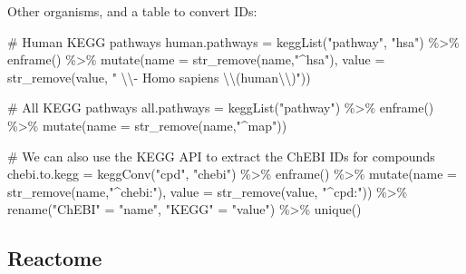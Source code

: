 \documentclass[
  24px,
  letterpaper,
  DIV=11,
  numbers=noendperiod]{scrartcl}
\newenvironment{Shaded}{\begin{snugshade}}{\end{snugshade}}
\newcommand{\AttributeTok}[1]{\textcolor[rgb]{0.40,0.45,0.13}{#1}}
\newcommand{\CommentTok}[1]{\textcolor[rgb]{0.37,0.37,0.37}{#1}}
\newcommand{\FunctionTok}[1]{\textcolor[rgb]{0.28,0.35,0.67}{#1}}
\newcommand{\NormalTok}[1]{\textcolor[rgb]{0.00,0.23,0.31}{#1}}
\newcommand{\OtherTok}[1]{\textcolor[rgb]{0.00,0.23,0.31}{#1}}
\newcommand{\SpecialCharTok}[1]{\textcolor[rgb]{0.37,0.37,0.37}{#1}}
\newcommand{\StringTok}[1]{\textcolor[rgb]{0.13,0.47,0.30}{#1}}
\begin{document}
Other organisms, and a table to convert IDs:

\begin{Shaded}
\begin{Highlighting}[]
\CommentTok{\# Human KEGG pathways}
\NormalTok{human.pathways }\OtherTok{=} \FunctionTok{keggList}\NormalTok{(}\StringTok{"pathway"}\NormalTok{, }\StringTok{"hsa"}\NormalTok{) }\SpecialCharTok{\%\textgreater{}\%} 
  \FunctionTok{enframe}\NormalTok{() }\SpecialCharTok{\%\textgreater{}\%} 
  \FunctionTok{mutate}\NormalTok{(}\AttributeTok{name =} \FunctionTok{str\_remove}\NormalTok{(name,}\StringTok{"\^{}hsa"}\NormalTok{), }
         \AttributeTok{value =} \FunctionTok{str\_remove}\NormalTok{(value, }\StringTok{" }\SpecialCharTok{\textbackslash{}\textbackslash{}}\StringTok{{-} Homo sapiens }\SpecialCharTok{\textbackslash{}\textbackslash{}}\StringTok{(human}\SpecialCharTok{\textbackslash{}\textbackslash{}}\StringTok{)"}\NormalTok{))}

\CommentTok{\# All KEGG pathways}
\NormalTok{all.pathways }\OtherTok{=} \FunctionTok{keggList}\NormalTok{(}\StringTok{"pathway"}\NormalTok{) }\SpecialCharTok{\%\textgreater{}\%} 
  \FunctionTok{enframe}\NormalTok{() }\SpecialCharTok{\%\textgreater{}\%} 
  \FunctionTok{mutate}\NormalTok{(}\AttributeTok{name =} \FunctionTok{str\_remove}\NormalTok{(name,}\StringTok{"\^{}map"}\NormalTok{))}

\CommentTok{\# We can also use the KEGG API to extract the ChEBI IDs for compounds}
\NormalTok{chebi.to.kegg }\OtherTok{=} \FunctionTok{keggConv}\NormalTok{(}\StringTok{"cpd"}\NormalTok{, }\StringTok{"chebi"}\NormalTok{) }\SpecialCharTok{\%\textgreater{}\%} 
  \FunctionTok{enframe}\NormalTok{() }\SpecialCharTok{\%\textgreater{}\%} 
  \FunctionTok{mutate}\NormalTok{(}\AttributeTok{name =} \FunctionTok{str\_remove}\NormalTok{(name,}\StringTok{"\^{}chebi:"}\NormalTok{), }
         \AttributeTok{value =} \FunctionTok{str\_remove}\NormalTok{(value, }\StringTok{"\^{}cpd:"}\NormalTok{)) }\SpecialCharTok{\%\textgreater{}\%}
  \FunctionTok{rename}\NormalTok{(}\StringTok{"ChEBI"} \OtherTok{=} \StringTok{"name"}\NormalTok{, }\StringTok{"KEGG"} \OtherTok{=} \StringTok{"value"}\NormalTok{) }\SpecialCharTok{\%\textgreater{}\%} 
  \FunctionTok{unique}\NormalTok{()}
\end{Highlighting}
\end{Shaded}

\hypertarget{reactome}{%
\subsection{Reactome}\label{reactome}}
\end{document}
